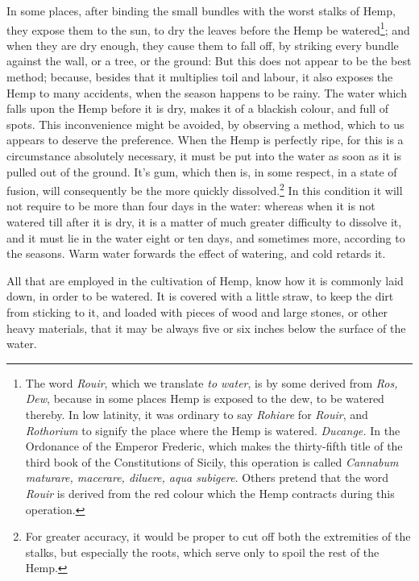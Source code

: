\documentclass[a4paper, 11pt, oneside, polutonikogreek, english]{article}
\begin{document}
In some places, after binding the small bundles with the worst stalks of Hemp, they expose them to the sun, to dry the leaves before the Hemp be watered\footnote{The word \emph{Rouir}, which we translate \emph{to water}, is by some derived from \emph{Ros, Dew}, because in some places Hemp is exposed to the dew, to be watered thereby. In low latinity, it was ordinary to say \emph{Rohiare} for \emph{Rouir}, and \emph{Rothorium} to signify the place where the Hemp is watered. \emph{Ducange.}  In the Ordonance of the Emperor Frederic, which makes the thirty-fifth title of the third book of the Constitutions of Sicily, this operation is called \emph{Cannabum maturare, macerare, diluere, aqua subigere}.  Others pretend that the word \emph{Rouir} is derived from the red colour which the Hemp contracts during this operation.}; and when they are dry enough, they cause them to fall off, by striking every bundle against the wall, or a tree, or the ground: But this does not appear to be the best method; because, besides that it multiplies toil and labour, it also exposes the Hemp to many accidents, when the season happens to be rainy. The water which falls upon the Hemp before it is dry, makes it of a blackish colour, and full of spots. This inconvenience might be avoided, by observing a method, which to us appears to deserve the preference. When the Hemp is perfectly ripe, for this is a circumstance absolutely necessary, it must be put into the water as soon as it is pulled out of the ground. It's gum, which then is, in some respect, in a state of fusion, will consequently be the more quickly dissolved.\footnote{For greater accuracy, it would be proper to cut off both the extremities of the stalks, but especially the roots, which serve only to spoil the rest of the Hemp.} In this condition it will not require to be more than four days in the water: whereas when it is not watered till after it is dry, it is a matter of much greater difficulty to dissolve it, and it must lie in the water eight or ten days, and sometimes more, according to the seasons. Warm water forwards the effect of watering, and cold retards it.

All that are employed in the cultivation of Hemp, know how it is commonly laid down, in order to be watered. It is covered with a little straw, to keep the dirt from sticking to it, and loaded with pieces of wood and large stones, or other heavy materials, that it may be always five or six inches below the surface of the water.
\end{document}
